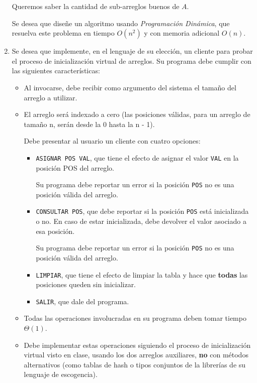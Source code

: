\documentclass[letterpaper, 12pt]{article}
\begin{document}
\begin{enumerate}
Queremos saber la cantidad de sub-arreglos buenos de $A$.

Se desea que diseñe un algoritmo usando \emph{Programación Dinámica}, que resuelva este problema en tiempo $O(n^2)$ y con memoria adicional $O(n)$.


\item Se desea que implemente, en el lenguaje de su elección, un cliente para probar el proceso de inicialización virtual de arreglos. Su programa debe cumplir con las siguientes características:

\begin{itemize}
    \item  Al invocarse, debe recibir como argumento del sistema el tamaño del arreglo a utilizar.
    \item El arreglo será indexado a cero (las posiciones válidas, para un arreglo de tamaño n,
    serán desde la 0 hasta la n - 1).

    Debe presentar al usuario un cliente con cuatro opciones:
    \begin{itemize}
        \item \texttt{ASIGNAR POS VAL}, que tiene el efecto de asignar el valor \texttt{VAL} en la posición {POS} del arreglo.

        Su programa debe reportar un error si la posición \texttt{POS} no es una posición válida del arreglo.

        \item \texttt{CONSULTAR POS}, que debe reportar si la posición \texttt{POS} está inicializada o no. En caso de estar inicializada, debe devolver el valor asociado a esa posición.

        Su programa debe reportar un error si la posición \texttt{POS} no es una posición válida del arreglo.

        \item \texttt{LIMPIAR}, que tiene el efecto de limpiar la tabla y hace que \textbf{todas} las posiciones queden sin inicializar.

        \item \texttt{SALIR}, que dale del programa.
    \end{itemize}

    \item Todas las operaciones involucradas en su programa deben tomar tiempo $\Theta(1)$.

    \item Debe implementar estas operaciones siguiendo el proceso de inicialización virtual visto en clase, usando los dos arreglos auxiliares, \textbf{no} con métodos alternativos (como tablas de hash o tipos conjuntos de la librerías de su lenguaje de escogencia).
\end{itemize}



\end{enumerate}
\end{document}
